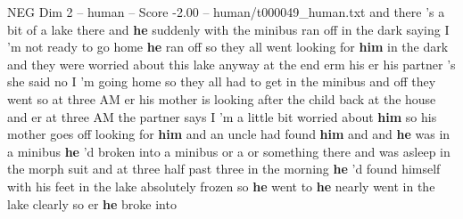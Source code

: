 \begin{textsample}{NEG Dim 2 – human – Score -2.00 – human/t000049\_human.txt}  \label{ex:f2_neg_020}
and there 's a bit of a lake there and \textbf{he} suddenly with the minibus ran off in the dark saying I 'm not ready to go home \textbf{he} ran off so they all went looking for \textbf{him} in the dark and they were worried about this lake anyway at the end erm his er his partner 's she said no I 'm going home so they all had to get in the minibus and off they went so at three AM er his mother is looking after the child back at the house and er at three AM the partner says I 'm a little bit worried about \textbf{him} so his mother goes off looking for \textbf{him} and an uncle had found \textbf{him} and and \textbf{he} was in a minibus \textbf{he} 'd broken into a minibus or a or something there and was asleep in the morph suit and at three half past three in the morning \textbf{he} 'd found himself with his feet in the lake absolutely frozen so \textbf{he} went to \textbf{he} nearly went in the lake clearly so er \textbf{he} broke into

\end{textsample}
